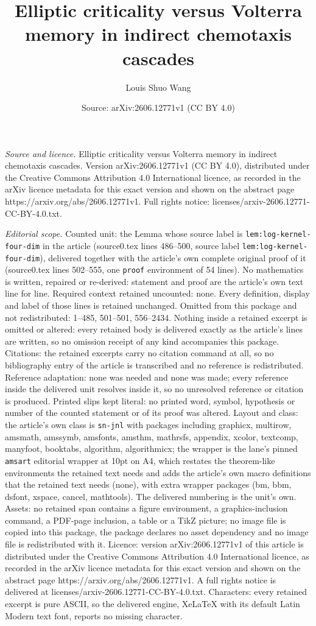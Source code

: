 \documentclass[10pt,a4paper]{amsart}
\title[Elliptic criticality versus Volterra memory in indirect chem]{Elliptic criticality versus Volterra memory in indirect chemotaxis cascades}
\author{Louis Shuo Wang}
\date{Source: arXiv:2606.12771v1 (CC BY 4.0)}
\begin{document}
\maketitle

\noindent\emph{Source and licence.} Elliptic criticality versus Volterra memory in indirect chemotaxis cascades. Version arXiv:2606.12771v1 (CC BY 4.0), distributed under the Creative Commons Attribution 4.0 International licence, as recorded in the arXiv licence metadata for this exact version and shown on the abstract page https://arxiv.org/abs/2606.12771v1. Full rights notice: licenses/arxiv-2606.12771-CC-BY-4.0.txt.\par\smallskip

\noindent\textit{Editorial scope.} Counted unit: the Lemma whose source label is \texttt{lem:log-kernel-four-dim} in the article (source0.tex lines 486--500, source label \texttt{lem:log-kernel-four-dim}), delivered together with the article's own complete original proof of it (source0.tex lines 502--555, one \texttt{proof} environment of 54 lines). No mathematics is written, repaired or re-derived: statement and proof are the article's own text line for line. Required context retained uncounted: none. Every definition, display and label of those lines is retained unchanged. Omitted from this package and not redistributed: 1--485, 501--501, 556--2434. Nothing inside a retained excerpt is omitted or altered: every retained body is delivered exactly as the article's lines are written, so no omission receipt of any kind accompanies this package. Citations: the retained excerpts carry no citation command at all, so no bibliography entry of the article is transcribed and no reference is redistributed. Reference adaptation: none was needed and none was made; every reference inside the delivered unit resolves inside it, so no unresolved reference or citation is produced. Printed slips kept literal: no printed word, symbol, hypothesis or number of the counted statement or of its proof was altered. Layout and class: the article's own class is \texttt{sn-jnl} with packages including graphicx, multirow, amsmath, amssymb, amsfonts, amsthm, mathrsfs, appendix, xcolor, textcomp, manyfoot, booktabs, algorithm, algorithmicx; the wrapper is the lane's pinned \texttt{amsart} editorial wrapper at 10pt on A4, which restates the theorem-like environments the retained text needs and adds the article's own macro definitions that the retained text needs (none), with extra wrapper packages (bm, bbm, dsfont, xspace, cancel, mathtools). The delivered numbering is the unit's own. Assets: no retained span contains a figure environment, a graphics-inclusion command, a PDF-page inclusion, a table or a TikZ picture; no image file is copied into this package, the package declares no asset dependency and no image file is redistributed with it. Licence: version arXiv:2606.12771v1 of this article is distributed under the Creative Commons Attribution 4.0 International licence, as recorded in the arXiv licence metadata for this exact version and shown on the abstract page https://arxiv.org/abs/2606.12771v1. A full rights notice is delivered at licenses/arxiv-2606.12771-CC-BY-4.0.txt. Characters: every retained excerpt is pure ASCII, so the delivered engine, XeLaTeX with its default Latin Modern text font, reports no missing character.
\end{document}
